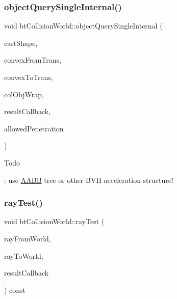 \subsubsection{\texorpdfstring{object\+Query\+Single\+Internal()}{objectQuerySingleInternal()}}
{\footnotesize\ttfamily void bt\+Collision\+World\+::object\+Query\+Single\+Internal (\begin{DoxyParamCaption}\item[{const bt\+Convex\+Shape $\ast$}]{cast\+Shape,  }\item[{const bt\+Transform \&}]{convex\+From\+Trans,  }\item[{const bt\+Transform \&}]{convex\+To\+Trans,  }\item[{const \hyperlink{structbtCollisionObjectWrapper}{bt\+Collision\+Object\+Wrapper} $\ast$}]{col\+Obj\+Wrap,  }\item[{\hyperlink{structbtCollisionWorld_1_1ConvexResultCallback}{Convex\+Result\+Callback} \&}]{result\+Callback,  }\item[{bt\+Scalar}]{allowed\+Penetration }\end{DoxyParamCaption})\hspace{0.3cm}{\ttfamily [static]}}

\begin{DoxyRefDesc}{Todo}
\item[\hyperlink{todo__todo000010}{Todo}]\+: use \hyperlink{classAABB}{A\+A\+BB} tree or other B\+VH acceleration structure! \end{DoxyRefDesc}
\mbox{\label{classbtCollisionWorld_a01fb1f5ff8a93c11f0c6837d225ae4b7}} 
\subsubsection{\texorpdfstring{ray\+Test()}{rayTest()}\hspace{0.1cm}{\footnotesize\ttfamily [1/2]}}
{\footnotesize\ttfamily void bt\+Collision\+World\+::ray\+Test (\begin{DoxyParamCaption}\item[{const bt\+Vector3 \&}]{ray\+From\+World,  }\item[{const bt\+Vector3 \&}]{ray\+To\+World,  }\item[{\hyperlink{structbtCollisionWorld_1_1RayResultCallback}{Ray\+Result\+Callback} \&}]{result\+Callback }\end{DoxyParamCaption}) const\hspace{0.3cm}{\ttfamily [virtual]}}

